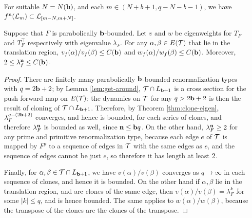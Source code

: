 \begin{cor} \label{cor:bounded-gamma}
For suitable $N = N(\mathbf b)$, 
and each $m \in  (N+b + 1, q-N-b-1)$, 
we have $f^{\mathbf{n}}(\mathcal L_m) \subset \mathcal L_{[m-N, m+N]}$. 
\end{cor}




\begin{prop} \label{prop:eigenweights}
{Suppose that $F$ is parabolically $\mathbf b$-bounded. 
Let $v$ and $w$ be eigenweights for $T_F$ and $T_F^\top$ respectively with eigenvalue $\lambda_F$.
For any $\alpha, \beta \in E(\mathcal T)$ that lie in the translation region, 
$v_f(\alpha)/v_f(\beta) \le C(\mathbf b)$ and $w_f(\alpha)/w_f(\beta) \le C(\mathbf b)$. Moreover, $2 \le \lambda_f^{\mathbf{n}} \le C(\mathbf b)$.}
\end{prop}

\begin{proof}
There are finitely many parabolically $\mathbf b$-bounded renormalization types with $q = 2 \mathbf b + 2$;
by Lemma \ref{lem:get-around},
$\mathcal T \cap L_{\mathbf b + 1}$ is a cross section for the push-forward map on $E(\mathcal T)$;
the dynamics on $\mathcal T$ for any $q > 2\mathbf b +2$ is then the result of cloning of $\mathcal T \cap L_{\mathbf b + 1}$. 
Therefore,
by Theorem \ref{thm:clone-eigen},
$\lambda_F^{q - (2 \mathbf b + 2)}$ converges, and hence is bounded, for each series of clones,
and therefore $\lambda_F^{\mathbf{n}}$ is bounded as well, since $\mathbf{n} \le \mathbf b q$. 
On the other hand,
$\lambda_F^{\mathbf{n}} \ge 2$ for any prime and primitive renormalization type,
because each edge $e$ of $\mathcal T$ is mapped by $F^p$ to a sequence of edges in $\mathcal T$ with the same edges as $e$, and the sequence of edges cannot be just $e$, so therefore it has length at least 2.

Finally,
for $\alpha, \beta \in \mathcal T \cap L_{\mathbf b+1}$, 
we have $v(\alpha)/v(\beta)$ converges as $q \to \infty$ in each sequence of clones, and hence it is bounded.
On the other hand if $\alpha, \beta$ lie in the translation region, and are clones of the same edge, 
then $v(\alpha)/v(\beta) = \lambda_F^k$ for some $|k| \le q$, and is hence bounded.
The same applies to $w(\alpha)/w(\beta)$,
because the transpose of the clones are the clones of the transpose.
\end{proof}


